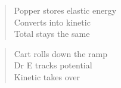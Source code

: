 \vspace*{\fill}
\begin{verse}
Popper stores elastic energy \\
Converts into kinetic \\
Total stays the same 
\end{verse}
\vspace{\fill}
\begin{verse}
Cart rolls down the ramp \\
Dr E tracks potential \\
Kinetic takes over 
\end{verse}
\vspace*{\fill}
